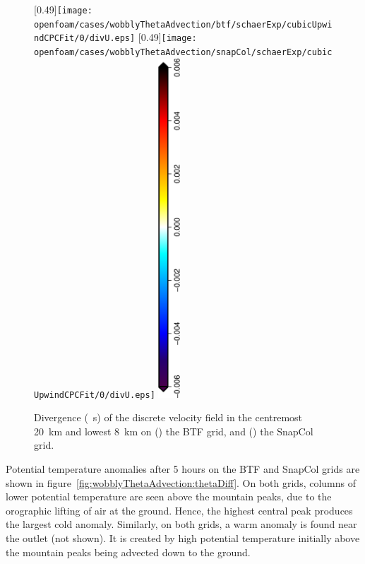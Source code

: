 \begin{figure}
	\captionsetup[subfigure]{position=b}
	\centering
%
	[0.49\textwidth]{\texttt{[image: openfoam/cases/wobblyThetaAdvection/btf/schaerExp/cubicUpwindCPCFit/0/divU.eps]}}
	\hfill
	[0.49\textwidth]{\texttt{[image: openfoam/cases/wobblyThetaAdvection/snapCol/schaerExp/cubicUpwindCPCFit/0/divU.eps]}}
%
	\includegraphics[height=5in,angle=270]{legends/divU.eps}
%
	\caption{Divergence (\si{\per\second}) of the discrete velocity field in the centremost \SI{20}{\kilo\meter} and lowest \SI{8}{\kilo\meter} on () the BTF grid, and () the SnapCol grid.}
	\label{fig:wobblyThetaAdvection:div}
\end{figure}


Potential temperature anomalies after 5 hours on the BTF and SnapCol grids are shown in figure~\ref{fig:wobblyThetaAdvection:thetaDiff}.  On both grids, columns of lower potential temperature are seen above the mountain peaks, due to the orographic lifting of air at the ground.  Hence, the highest central peak produces the largest cold anomaly.  Similarly, on both grids, a warm anomaly is found near the outlet (not shown).  It is created by high potential temperature initially above the mountain peaks being advected down to the ground.


